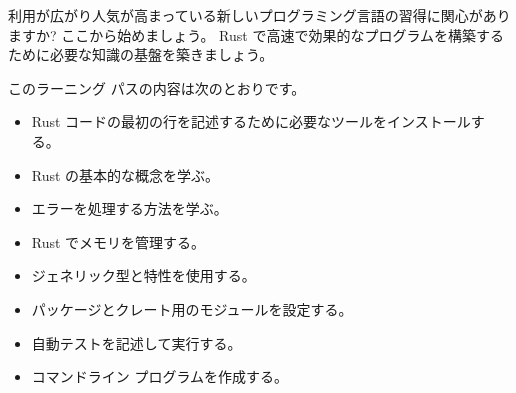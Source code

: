 利用が広がり人気が高まっている新しいプログラミング言語の習得に関心がありますか? ここから始めましょう。 Rust で高速で効果的なプログラムを構築するために必要な知識の基盤を築きましょう。

このラーニング パスの内容は次のとおりです。

\begin{itemize}
\item Rust コードの最初の行を記述するために必要なツールをインストールする。
\item Rust の基本的な概念を学ぶ。
\item エラーを処理する方法を学ぶ。
\item Rust でメモリを管理する。
\item ジェネリック型と特性を使用する。
\item パッケージとクレート用のモジュールを設定する。
\item 自動テストを記述して実行する。
\item コマンドライン プログラムを作成する。
\end{itemize}
